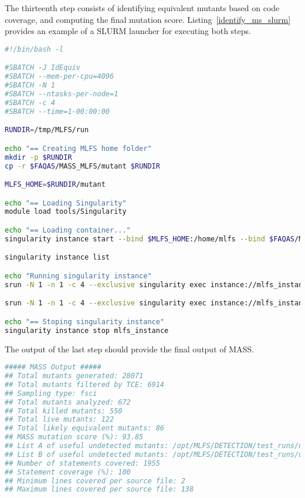 The thirteenth step consists of identifying equivalent mutants based on code coverage, and computing the final mutation score. Listing~\ref{identify_ms_slurm} provides an example of a SLURM launcher for executing both steps.

\begin{lstlisting}[language=bash, label=identify_ms_slurm ,caption=Example of a Bash launcher for the steps IdentifyEquivalents and MutationScore.]
#!/bin/bash -l

#SBATCH -J IdEquiv
#SBATCH --mem-per-cpu=4096
#SBATCH -N 1
#SBATCH --ntasks-per-node=1
#SBATCH -c 4
#SBATCH --time=1-00:00:00

RUNDIR=/tmp/MLFS/run

echo "== Creating MLFS home folder"
mkdir -p $RUNDIR
cp -r $FAQAS/MASS_MLFS/mutant $RUNDIR

MLFS_HOME=$RUNDIR/mutant

echo "== Loading Singularity"
module load tools/Singularity

echo "== Loading container..."
singularity instance start --bind $MLFS_HOME:/home/mlfs --bind $FAQAS/MASS_MLFS/MASS_WORKSPACE:/opt/MLFS --bind $FAQAS/srcirorfaqas:/opt/srcirorfaqas $FAQAS/MASS_MLFS/blts.sif mlfs_instance

singularity instance list

echo "Running singularity instance"
srun -N 1 -n 1 -c 4 --exclusive singularity exec instance://mlfs_instance /bin/bash /opt/MLFS/IdentifyEquivalents.sh

srun -N 1 -n 1 -c 4 --exclusive singularity exec instance://mlfs_instance /bin/bash /opt/MLFS/MutationScore.sh

echo "== Stoping singularity instance"
singularity instance stop mlfs_instance
\end{lstlisting}

The output of the last step should provide the final output of MASS.

\begin{lstlisting}[language=bash, label=output_mass_hpc ,caption=\MASS output.]
##### MASS Output #####
## Total mutants generated: 28071
## Total mutants filtered by TCE: 6914
## Sampling type: fsci
## Total mutants analyzed: 672
## Total killed mutants: 550
## Total live mutants: 122
## Total likely equivalent mutants: 86
## MASS mutation score (%): 93.85
## List A of useful undetected mutants: /opt/MLFS/DETECTION/test_runs/useful_list_a
## List B of useful undetected mutants: /opt/MLFS/DETECTION/test_runs/useful_list_b
## Number of statements covered: 1955
## Statement coverage (%): 100
## Minimum lines covered per source file: 2
## Maximum lines covered per source file: 138
\end{lstlisting}
